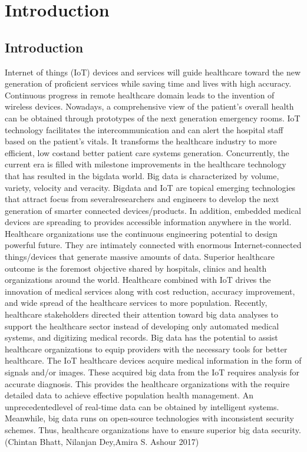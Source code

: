 
\chapter{Introduction} %

\label{Introduction} %

\section{Introduction}
Internet of things (IoT) devices and services will guide healthcare toward the new generation of proficient services while saving time and lives with high accuracy. Continuous progress in remote healthcare domain leads to the invention of wireless devices. Nowadays, a comprehensive view of the patient’s overall health can be obtained through prototypes of the next generation emergency rooms. IoT technology facilitates the intercommunication and can alert the hospital staff based on the patient’s vitals. It transforms the healthcare industry to more efficient, low costand better patient care systems generation. Concurrently, the current era is filled with milestone improvements in the healthcare technology that has resulted in the bigdata world. Big data is characterized by volume, variety, velocity and veracity. Bigdata and IoT are topical emerging technologies that attract focus from severalresearchers and engineers to develop the next generation of smarter connected devices/products. In addition, embedded medical devices are spreading to provides accessible information anywhere in the world. Healthcare organizations use the continuous engineering potential to design powerful future. They are intimately connected with enormous Internet-connected things/devices that generate massive amounts of data. Superior healthcare outcome is the foremost objective shared by hospitals, clinics and health organizations around the world. Healthcare combined with IoT drives the innovation of medical services along with cost reduction, accuracy improvement, and wide spread of the healthcare services to more population. Recently, healthcare stakeholders directed their attention toward big data analyses to support the healthcare sector instead of developing only automated medical systems, and digitizing medical records. Big data has the potential to assist healthcare organizations to equip providers with the necessary tools for better healthcare. The IoT healthcare devices acquire medical information in the form of signals and/or images. These acquired big data from the IoT requires analysis for accurate diagnosis. This provides the healthcare organizations with the require detailed data to achieve effective population health management. An unprecedentedlevel of real-time data can be obtained by intelligent systems. Meanwhile, big data runs on open-source technologies with inconsistent security schemes. Thus, healthcare organizations have to ensure superior big data security. (Chintan Bhatt, Nilanjan Dey,Amira S. Ashour 2017)
\newline

